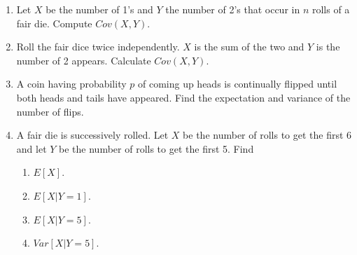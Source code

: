 \documentclass[12pt]{article}%
\newcommand{\0}{{\bf 0}}
\begin{document}
\begin{enumerate}







\item
Let $X$ be the number of 1's and $Y$ the number of 2's that occur in $n$ rolls of a fair die. Compute $Cov(X,Y)$.


\item
Roll the fair dice twice independently.
$X$ is the sum of the two and $Y$ is the number of 2 appears.
Calculate $Cov(X,Y)$.

\item
A coin having probability $p$ of coming up heads is continually flipped until both heads and tails have appeared. Find
the expectation and variance of the number of flips.





\item
A fair die is successively rolled. Let $X$ be the number of rolls to get the first 6
and
let $Y$ be the number of rolls to get the first 5. Find
\begin{enumerate}
\item $E[X]$.
\item $E[X|Y = 1]$.
\item $E[X|Y = 5]$.
\item $Var[X|Y = 5]$.
\end{enumerate}














\end{enumerate}
\end{document}
